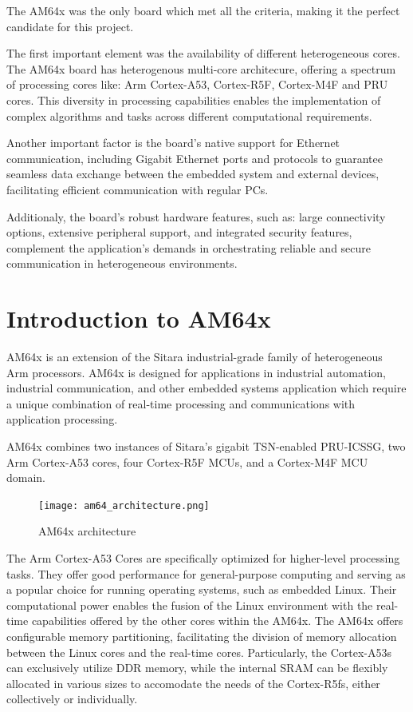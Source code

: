 The AM64x was the only board which met all the criteria, making it the perfect
candidate for this project.

The first important element was the availability of different heterogeneous
cores. The AM64x board has heterogenous multi-core architecure, offering a
spectrum of processing cores like: Arm Cortex-A53, Cortex-R5F, Cortex-M4F and
PRU cores. This diversity in processing capabilities enables the implementation
of complex algorithms and tasks across different computational requirements.

Another important factor is the board's native support for Ethernet
communication, including Gigabit Ethernet ports and protocols to guarantee 
seamless data exchange between the embedded system and external devices,
facilitating efficient communication with regular PCs.

Additionaly, the board's robust hardware features, such as: large connectivity
options, extensive peripheral support, and integrated security features,
complement the application's demands in orchestrating reliable and secure
communication in heterogeneous environments.

\section{Introduction to AM64x}

AM64x is an extension of the Sitara industrial-grade family of heterogeneous
Arm processors. \cite{AM64_datasheet}
AM64x is designed for applications in industrial automation, industrial
communication, and other embedded systems application which require a unique
combination of real-time processing and communications with application
processing. 

AM64x combines two instances of Sitara's gigabit TSN-enabled PRU-ICSSG,
two Arm Cortex-A53 cores, four Cortex-R5F MCUs, and a Cortex-M4F MCU
domain.

\begin{figure}[htb]
    \centering
    \texttt{[image: am64\_architecture.png]}
    \caption{AM64x architecture}
\end{figure}

The Arm Cortex-A53 Cores are specifically optimized for higher-level
processing tasks.
They offer good performance for general-purpose computing and serving as a
popular choice for running operating systems, such as embedded Linux.
Their computational power enables the fusion of the Linux environment with the
real-time capabilities offered by the other cores within the AM64x.
The AM64x offers configurable memory partitioning, facilitating the division
of memory allocation between the Linux cores and the real-time cores.
Particularly, the Cortex-A53s can exclusively utilize DDR memory, while 
the internal SRAM can be flexibly allocated in various sizes to accomodate
the needs of the Cortex-R5fs, either collectively or individually.

